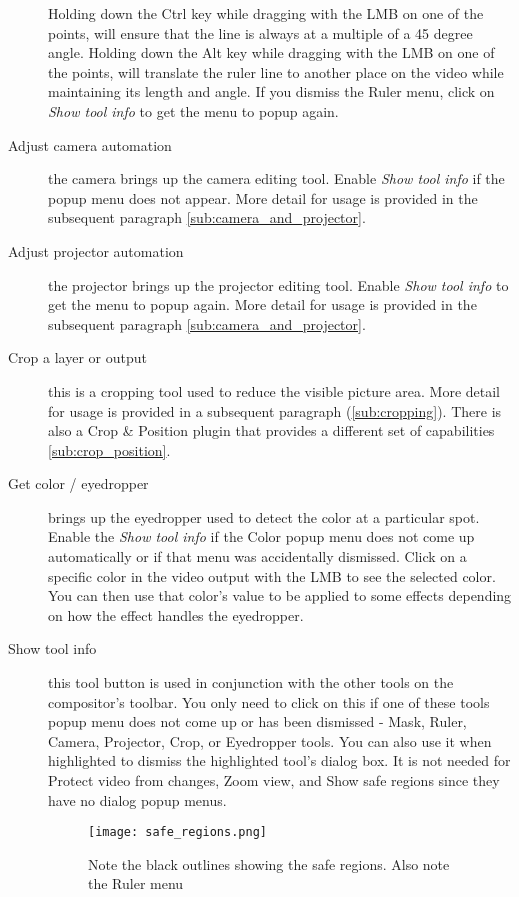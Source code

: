 \begin{description}
Holding down the Ctrl key while dragging with the LMB on one of the points, will
ensure that the line is always at a multiple of a 45 degree angle.  Holding down the Alt key while
dragging with the LMB on one of the points, will translate the ruler line to another place on 
the video while maintaining its length and angle. If you dismiss the Ruler menu, click on
\textit{Show tool info} to get the menu to popup again.  
    \item[Adjust camera automation]  the camera brings up the camera editing tool. Enable \textit{Show tool info} if the popup menu does not appear. More detail for usage is provided in the subsequent
paragraph \ref{sub:camera_and_projector}.
    \item[Adjust projector automation]  the projector brings up the projector editing tool. Enable \textit{Show tool info} to get the menu to popup again. More detail for usage is provided in the
subsequent paragraph \ref{sub:camera_and_projector}.
    \item[Crop a layer or output]  this is a cropping tool used to reduce the visible picture area.
More detail for usage is provided in a 
subsequent paragraph (\ref{sub:cropping}).  There is also a Crop \& Position plugin that provides
a different set of capabilities \ref{sub:crop_position}.
    \item[Get color / eyedropper]  brings up the eyedropper used to detect the color at a
particular spot.  Enable the \textit{Show tool info} if the Color popup menu does not come up 
automatically or if that menu was accidentally dismissed.  Click on a specific color in the video
output with the LMB to see the selected color. You can then use that color's 
value to be applied to some effects depending on how the effect handles the eyedropper.
    \item[Show tool info]  this tool button is used in conjunction with the other tools on the
compositor's toolbar. You only need to click on this if one of these tools popup menu does not
come up or has been dismissed - Mask, Ruler, Camera, Projector, Crop, or Eyedropper tools.
You can also use it when highlighted to dismiss the highlighted tool's dialog box.
It is not needed for Protect video from changes, Zoom view, and Show safe regions since they have
no dialog popup menus.

\begin{figure}[htpb]
    \centering
    \texttt{[image: safe\_regions.png]}
    \caption{Note the black outlines showing the safe regions. Also note the Ruler menu}
    \label{fig:safe_regions}
\end{figure}


\end{description}

